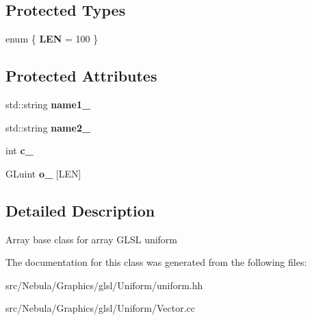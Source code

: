 \subsection*{Protected Types}
\begin{DoxyCompactItemize}
\item 
enum \{ {\bfseries L\-E\-N} = 100
 \}
\end{DoxyCompactItemize}
\subsection*{Protected Attributes}
\begin{DoxyCompactItemize}
\item 
\hypertarget{classNeb_1_1glsl_1_1Uniform_1_1Vector_1_1Base_a78a4f2843f5c87f11d67b5a29c95d6c2}{std\-::string {\bfseries name1\-\_\-}}\label{classNeb_1_1glsl_1_1Uniform_1_1Vector_1_1Base_a78a4f2843f5c87f11d67b5a29c95d6c2}

\item 
\hypertarget{classNeb_1_1glsl_1_1Uniform_1_1Vector_1_1Base_a2080091cb0f43f60e48f7c667cc3d65b}{std\-::string {\bfseries name2\-\_\-}}\label{classNeb_1_1glsl_1_1Uniform_1_1Vector_1_1Base_a2080091cb0f43f60e48f7c667cc3d65b}

\item 
\hypertarget{classNeb_1_1glsl_1_1Uniform_1_1Vector_1_1Base_adada72e697489b74dcca62bd2a6404d1}{int {\bfseries c\-\_\-}}\label{classNeb_1_1glsl_1_1Uniform_1_1Vector_1_1Base_adada72e697489b74dcca62bd2a6404d1}

\item 
\hypertarget{classNeb_1_1glsl_1_1Uniform_1_1Vector_1_1Base_a3e462add25f07b5e7b2815179f928b76}{G\-Luint {\bfseries o\-\_\-} \mbox{[}L\-E\-N\mbox{]}}\label{classNeb_1_1glsl_1_1Uniform_1_1Vector_1_1Base_a3e462add25f07b5e7b2815179f928b76}

\end{DoxyCompactItemize}


\subsection{Detailed Description}
Array base class for array G\-L\-S\-L uniform 

The documentation for this class was generated from the following files\-:\begin{DoxyCompactItemize}
\item 
src/\-Nebula/\-Graphics/glsl/\-Uniform/uniform.\-hh\item 
src/\-Nebula/\-Graphics/glsl/\-Uniform/Vector.\-cc\end{DoxyCompactItemize}
